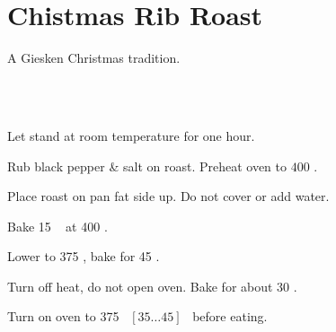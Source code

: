 \section{Chistmas Rib Roast}


\begin{recipestats}[
	servings=$2\;person \; / \; 1 \; lb$,
	preptime=1 \onefourth~ \hour,
	bakingtime=2 \onefourth~ \hour,
	source=Ralph Nelson (Fa),
	]
\end{recipestats}


\begin{recipeabstract}
	A Giesken Christmas tradition.
\end{recipeabstract}

\begin{ingredientcolumns}[1]
	\begin{ingredientblock}
		\\
		\\
	\end{ingredientblock}
\end{ingredientcolumns}

\begin{preparation}
\item Let stand at room temperature for one hour.

\item Rub black pepper \& salt on roast. Preheat oven to $400$ \Fahrenheit.

\item Place roast on pan fat side up. Do not cover or add water.

\item Bake 15 \minute~ at 400 \Fahrenheit.

\item Lower to 375 \Fahrenheit, bake for 45 \minute.

\item Turn off heat, do not open oven. Bake for about 30 \minute.


\item Turn on oven to 375 \Fahrenheit~$[35 \dots 45]$ \minute~before eating.
\end{preparation}

\recipeend
